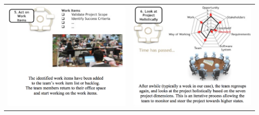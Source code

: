 \begin{table}[t]
\begin{tabular}{l|l}
\hline
\includegraphics[width=3.2in]{reflection_meeting_images/EssenceMeetingStep5.png} &
\includegraphics[width=3.2in]{reflection_meeting_images/EssenceMeetingStep6.png} \\
\end{tabular}
\label{EssenceReflectionMeetings}
\end{table}